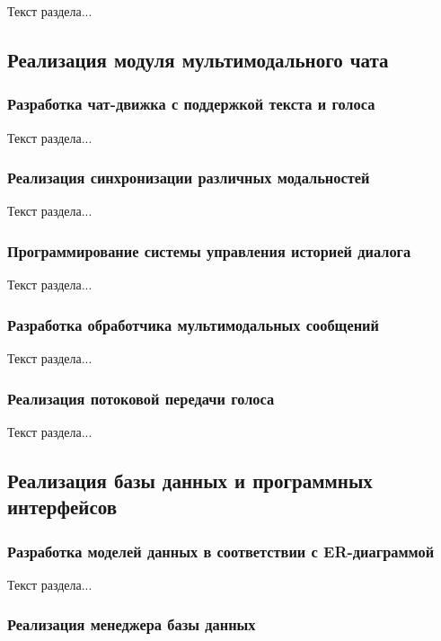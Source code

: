 Текст раздела...

\subsection{Реализация модуля мультимодального чата}

\subsubsection{Разработка чат-движка с поддержкой текста и голоса}

Текст раздела...

\subsubsection{Реализация синхронизации различных модальностей}

Текст раздела...

\subsubsection{Программирование системы управления историей диалога}

Текст раздела...

\subsubsection{Разработка обработчика мультимодальных сообщений}

Текст раздела...

\subsubsection{Реализация потоковой передачи голоса}

Текст раздела...

\subsection{Реализация базы данных и программных интерфейсов}

\subsubsection{Разработка моделей данных в соответствии с ER-диаграммой}

Текст раздела...

\subsubsection{Реализация менеджера базы данных}

